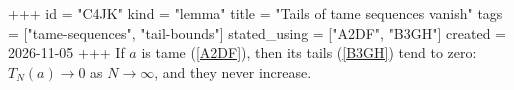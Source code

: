 +++
id = "C4JK"
kind = "lemma"
title = "Tails of tame sequences vanish"
tags = ["tame-sequences", "tail-bounds"]
stated_using = ["A2DF", "B3GH"]
created = 2026-11-05
+++
If $a$ is tame (\ref{A2DF}), then its tails (\ref{B3GH}) tend to zero: $T_N(a) \to 0$ as $N \to \infty$, and they never increase.
